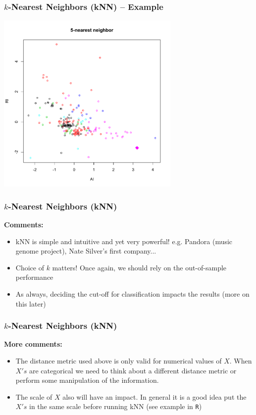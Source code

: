 \documentclass[flegn]{beamer}
\begin{document}
\begin{frame}
\frametitle{$k$-Nearest Neighbors (kNN) -- Example}

\vspace{-0.5cm}

\begin{center}
\includegraphics[width=3.5in]{knn4}
\end{center}

\end{frame}


\begin{frame}
\frametitle{$k$-Nearest Neighbors (kNN)}

{\bf Comments:}
\begin{itemize}
\item kNN is simple and intuitive and yet very powerful! {\color{red}e.g. Pandora (music genome project), Nate Silver's first company...} 
\item Choice of $k$ matters! Once again, we should rely on the out-of-sample performance
\item As always, deciding the cut-off for classification impacts the results (more on this later)
\end{itemize}
\end{frame}


\begin{frame}
\frametitle{$k$-Nearest Neighbors (kNN)}

{\bf More  comments:}
\begin{itemize}
\item The distance metric used above is only valid for numerical values of $X$. When $X's$ are categorical we need to think about a different distance metric or perform some manipulation of the information. 
\item The scale of $X$ also will have an impact. In general it is a good idea put the $X's$ in the same scale before running kNN (see example in {\tt R})
\end{itemize}
\end{frame}
\end{document}
